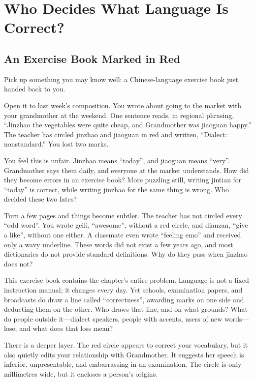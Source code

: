 \chapter[Who Decides Correct Language?]{Who Decides What Language Is Correct?}
\section{An Exercise Book Marked in Red}
Pick up something you may know well: a Chinese-language exercise book just handed back to you.

Open it to last week's composition. You wrote about going to the market with your grandmother at the weekend. One sentence reads, in regional phrasing, ``Jinzhao the vegetables were quite cheap, and Grandmother was jiaoguan happy.'' The teacher has circled jinzhao and jiaoguan in red and written, ``Dialect: nonstandard.'' You lost two marks.

You feel this is unfair. Jinzhao means ``today'', and jiaoguan means ``very''. Grandmother says them daily, and everyone at the market understands. How did they become errors in an exercise book? More puzzling still, writing jintian for ``today'' is correct, while writing jinzhao for the same thing is wrong. Who decided these two fates?

Turn a few pages and things become subtler. The teacher has not circled every ``odd word''. You wrote geili, ``awesome'', without a red circle, and dianzan, ``give a like'', without one either. A classmate even wrote ``feeling emo'' and received only a wavy underline. These words did not exist a few years ago, and most dictionaries do not provide standard definitions. Why do they pass when jinzhao does not?

This exercise book contains the chapter's entire problem. Language is not a fixed instruction manual; it changes every day. Yet schools, examination papers, and broadcasts do draw a line called ``correctness'', awarding marks on one side and deducting them on the other. Who draws that line, and on what grounds? What do people outside it---dialect speakers, people with accents, users of new words---lose, and what does that loss mean?

There is a deeper layer. The red circle appears to correct your vocabulary, but it also quietly edits your relationship with Grandmother. It suggests her speech is inferior, unpresentable, and embarrassing in an examination. The circle is only millimetres wide, but it encloses a person's origins.

